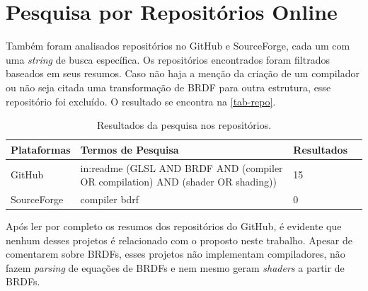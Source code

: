 \section{Pesquisa por Repositórios Online}
Também foram analisados repositórios no GitHub e SourceForge, cada um com uma \textit{string} de busca específica. Os repositórios encontrados foram filtrados baseados em seus resumos. Caso não haja a menção da criação de um compilador ou não seja citada uma transformação de BRDF para outra estrutura, esse repositório foi excluído. O resultado se encontra na \autoref{tab-repo}.






\begin{table}[H]
\ABNTEXfontereduzida
\caption[bases]{\small Resultados da pesquisa nos repositórios.}
\label{tab-repo}
\begin{tabular}{p{2.6cm}|p{6.0cm}|p{2.25cm}|p{3.40cm}}
   \textbf{Plataformas} & \textbf{Termos de Pesquisa}  & \textbf{Resultados}\\
   \hline
   GitHub
   &
   in:readme (GLSL AND BRDF AND  (compiler OR compilation) AND (shader OR shading))
   & 15
   \\ \hline
   SourceForge
   &
   compiler bdrf
   & 0
\end{tabular}
\end{table}




Após ler por completo os resumos dos repositórios do GitHub, é evidente que nenhum desses projetos é relacionado com o proposto neste trabalho. Apesar de comentarem sobre BRDFs, esses projetos não implementam compiladores, não fazem \textit{parsing} de equações de BRDFs e nem mesmo geram \textit{shaders} a partir de BRDFs.

